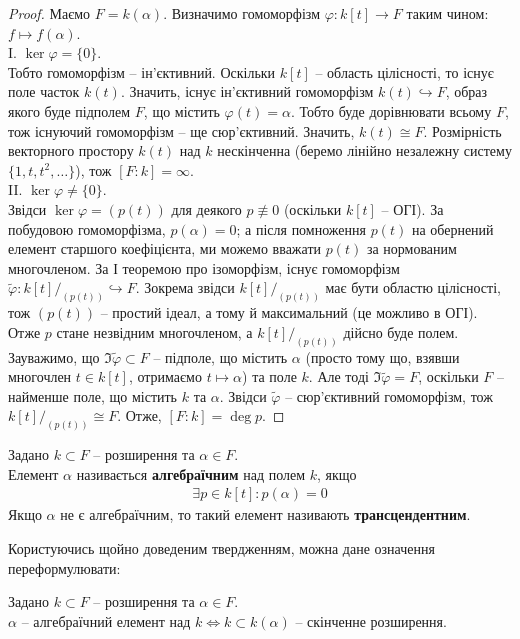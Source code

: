\documentclass{math_library}
\begin{document}
\begin{proof}
Маємо $F = k(\alpha)$. Визначимо гомоморфізм $\varphi \colon k[t] \to F$ таким чином: $f \mapsto f(\alpha)$.\\
I. \textit{$\ker \varphi = \{0\}$}.\\
Тобто гомоморфізм -- ін'єктивний. Оскільки $k[t]$ -- область цілісності, то існує поле часток $k(t)$. Значить, існує ін'єктивний гомоморфізм $k(t) \hookrightarrow F$, образ якого буде підполем $F$, що містить $\varphi(t) = \alpha$. Тобто буде дорівнювати всьому $F$, тож існуючий гомоморфізм -- ще сюр'єктивний. Значить, $k(t) \cong F$. Розмірність векторного простору $k(t)$ над $k$ нескінченна (беремо лінійно незалежну систему $\{1,t,t^2,\dots\}$), тож $[F:k] = \infty$.
\bigskip \\
II. \textit{$\ker \varphi \neq \{0\}$}.\\
Звідси $\ker \varphi = (p(t))$ для деякого $p \not\equiv 0$ (оскільки $k[t]$ -- ОГІ). За побудовою гомоморфізма, $p(\alpha) = 0$; а після помноження $p(t)$ на обернений елемент старшого коефіцієнта, ми можемо вважати $p(t)$ за нормованим многочленом. За І теоремою про ізоморфізм, існує гомоморфізм $\tilde{\varphi} \colon k[t]/_{(p(t))} \hookrightarrow F$. Зокрема звідси $k[t]/_{(p(t))}$ має бути областю цілісності, тож $(p(t))$ -- простий ідеал, а тому й максимальний (це можливо в ОГІ). Отже $p$ стане незвідним многочленом, а $k[t]/_{(p(t))}$ дійсно буде полем. Зауважимо, що $\Im \tilde{\varphi} \subset F$ -- підполе, що містить $\alpha$ (просто тому що, взявши многочлен $t \in k[t]$, отримаємо $t \mapsto \alpha$) та поле $k$. Але тоді $\Im \tilde{\varphi} = F$, оскільки $F$ -- найменше поле, що містить $k$ та $\alpha$. Звідси $\tilde{\varphi}$ -- сюр'єктивний гомоморфізм, тож $k[t]/_{(p(t))} \cong F$. Отже, $[F:k] = \deg p$. 
\end{proof}

\begin{definition}
Задано $k \subset F$ -- розширення та $\alpha \in F$.\\
Елемент $\alpha$ називається \textbf{алгебраїчним} над полем $k$, якщо
\begin{align*}
\exists p \in k[t]: p(\alpha) = 0
\end{align*}
Якщо $\alpha$ не є алгебраїчним, то такий елемент називають \textbf{трансцендентним}.
\end{definition}

Користуючись щойно доведеним твердженням, можна дане означення переформулювати:
\begin{corollary}
Задано $k \subset F$ -- розширення та $\alpha \in F$.\\
$\alpha$ -- алгебраїчний елемент над $k \iff k \subset k(\alpha)$ -- скінченне розширення.
\end{corollary}
\end{document}
